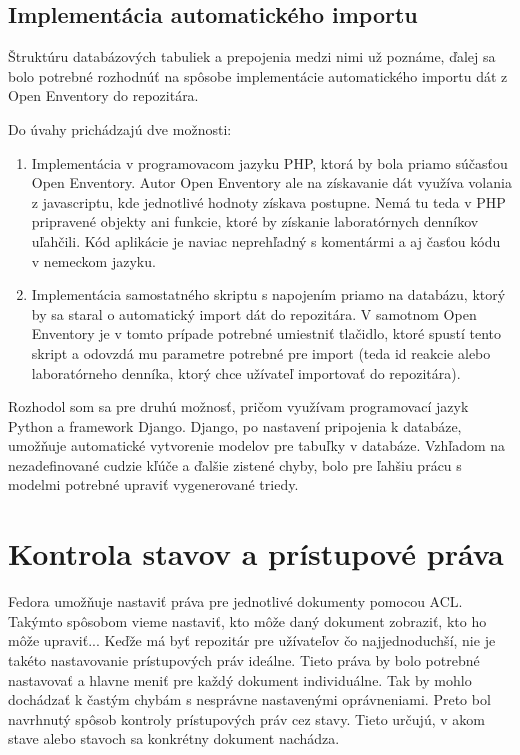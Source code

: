 \documentclass[thesis=M,slovak]{FITthesis}[2013/05/06]
\begin{document}
\subsection{Implementácia automatického importu}
Štruktúru databázových tabuliek a prepojenia medzi nimi už poznáme, ďalej sa bolo potrebné rozhodnúť na spôsobe implementácie automatického importu dát z Open Enventory do repozitára.

Do úvahy prichádzajú dve možnosti:
\begin{enumerate}
	\item Implementácia v programovacom jazyku PHP, ktorá by bola priamo súčasťou Open Enventory. Autor Open Enventory ale na získavanie dát využíva volania z javascriptu, kde jednotlivé hodnoty získava postupne. Nemá tu teda v PHP pripravené objekty ani funkcie, ktoré by získanie laboratórnych denníkov uľahčili. Kód aplikácie je naviac neprehľadný s komentármi a aj časťou kódu v nemeckom jazyku.
	\item Implementácia samostatného skriptu s napojením priamo na databázu, ktorý by sa staral o automatický import dát do repozitára. V samotnom Open Enventory je v tomto prípade potrebné umiestniť tlačidlo, ktoré spustí tento skript a odovzdá mu parametre potrebné pre import (teda id reakcie alebo laboratórneho denníka, ktorý chce užívateľ importovať do repozitára).
\end{enumerate}

Rozhodol som sa pre druhú možnosť, pričom využívam programovací jazyk Python a framework Django. Django, po nastavení pripojenia k databáze, umožňuje automatické vytvorenie modelov pre tabuľky v databáze. Vzhľadom na nezadefinované cudzie kľúče a ďalšie zistené chyby, bolo pre ľahšiu prácu s modelmi potrebné upraviť vygenerované triedy.

\section{Kontrola stavov a prístupové práva} \label{stavy}
Fedora umožňuje nastaviť práva pre jednotlivé dokumenty pomocou ACL. Takýmto spôsobom vieme nastaviť, kto môže daný dokument zobraziť, kto ho môže upraviť... Keďže má byť repozitár pre užívateľov čo najjednoduchší, nie je takéto nastavovanie prístupových práv ideálne. Tieto práva by bolo potrebné nastavovať a hlavne meniť pre každý dokument individuálne. Tak by mohlo dochádzať k častým chybám s nesprávne nastavenými oprávneniami. Preto bol navrhnutý spôsob kontroly prístupových práv cez stavy. Tieto určujú, v akom stave alebo stavoch sa konkrétny dokument nachádza.
\end{document}
